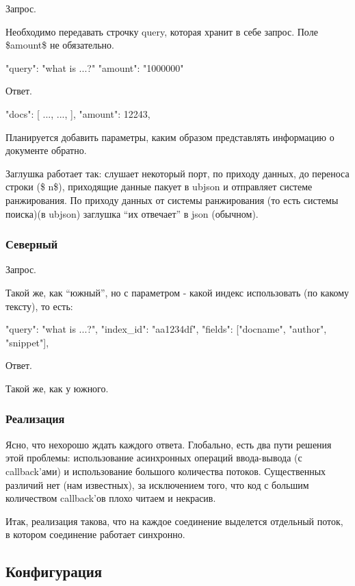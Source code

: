 Запрос.

Необходимо передавать строчку query, которая хранит в себе запрос. Поле \$amount\$ не обязательно. \begin{DoxyVerb}{
    "query": "what is ...?"
    "amount": "1000000"
}
\end{DoxyVerb}


Ответ. \begin{DoxyVerb}{
    "docs": [ {...}, {...}, ],
    "amount": 12243,
}
\end{DoxyVerb}


Планируется добавить параметры, каким образом представлять информацию о документе обратно.

Заглушка работает так\-: слушает некоторый порт, по приходу данных, до переноса строки (\$ n\$), приходящие данные пакует в ubjson и отправляет системе ранжирования. По приходу данных от системы ранжирования (то есть системы поиска)(в ubjson) заглушка “их отвечает” в json (обычном).

\subsubsection*{Северный}

Запрос.

Такой же, как “южный”, но с параметром -\/ какой индекс использовать (по какому тексту), то есть\-: \begin{DoxyVerb}{
    "query": "what is ...?",
    "index_id": "aa1234df",
    "fields": ["docname", "author", "snippet"],
}
\end{DoxyVerb}


Ответ.

Такой же, как у южного.

\subsubsection*{Реализация}

Ясно, что нехорошо ждать каждого ответа. Глобально, есть два пути решения этой проблемы\-: использование асинхронных операций ввода-\/вывода (с callback’ами) и использование большого количества потоков. Существенных различий нет (нам известных), за исключением того, что код с большим количеством callback’ов плохо читаем и некрасив.

Итак, реализация такова, что на каждое соединение выделется отдельный поток, в котором соединение работает синхронно.

\subsection*{Конфигурация }

